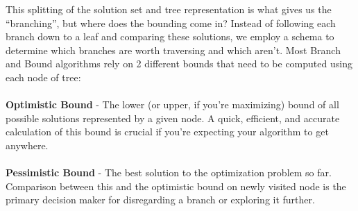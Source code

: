 \documentclass{article}
\begin{document}
\begin{center}
\end{center}

\noindent
This splitting of the solution set and tree representation is what 
gives us the ``branching'', but where does the bounding come in?
Instead of following each branch down to a leaf and comparing these solutions, we 
employ a schema to determine which branches are worth traversing and which aren't.
Most Branch and Bound algorithms rely on 2 different bounds that need to be computed 
using each node of tree:\\\\

\noindent
\textbf{Optimistic Bound} - The lower (or upper, if you're maximizing) bound of all 
possible solutions represented by a given node. A quick, efficient, and accurate 
calculation of this bound is crucial if you're expecting your algorithm to get anywhere.
\\\\

\noindent
\textbf{Pessimistic Bound} - The best solution to the optimization problem so far. 
Comparison between this and the optimistic bound on newly visited node is the primary 
decision maker for disregarding a branch or exploring it further.\\\\
\end{document}

